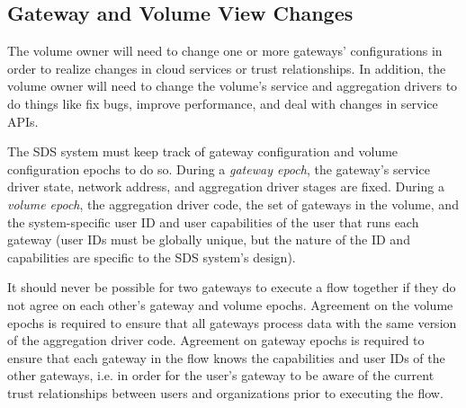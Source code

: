 \subsection{Gateway and Volume View Changes}
\label{sec:gateway-volume-view-changes}

The volume owner will need to change one or more gateways'
configurations in order to realize changes in cloud services or trust relationships.
In addition, the volume owner will need to 
change the volume's service and aggregation drivers to do things like fix bugs, improve
performance, and deal with changes in service APIs.

The SDS system must keep track of gateway configuration and volume configuration 
epochs to do so.  During a \emph{gateway epoch}, the gateway's service
driver state, network address, and aggregation driver stages are fixed.  During
a \emph{volume epoch}, the aggregation driver code, the set of gateways in the
volume, and the system-specific user ID and user capabilities of the user
that runs each gateway (user IDs must be globally unique, but the nature of the
ID and capabilities are specific to the SDS system's design).

It should never be possible for two gateways to execute a flow together if they
do not agree on each other's gateway and volume epochs.  Agreement on the volume
epochs is required to ensure that all gateways process data with the same version
of the aggregation driver code.  Agreement on gateway epochs is required to
ensure that each gateway in the flow knows the capabilities and user IDs of the
other gateways, i.e. in order for the user's gateway to be aware of the current
trust relationships between users and organizations prior to executing the flow.

